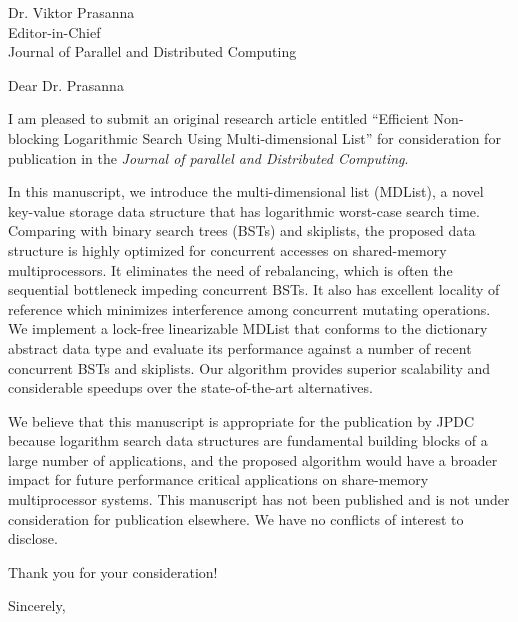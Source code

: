 \documentclass[letterpaper, 10pt]{letter}
\begin{document}
\begin{letter}{Dr. Viktor Prasanna\\Editor-in-Chief\\Journal of Parallel and Distributed Computing}
    \opening{Dear Dr. Prasanna}
    I am pleased to submit an original research article entitled ``Efficient Non-blocking Logarithmic Search Using Multi-dimensional List'' for consideration for publication in the \emph{Journal of parallel and Distributed Computing}.

    In this manuscript, we introduce the multi-dimensional list (MDList), a novel key-value storage data structure that has logarithmic worst-case search time.
    Comparing with binary search trees (BSTs) and skiplists, the proposed data structure is highly optimized for concurrent accesses on shared-memory multiprocessors.
    It eliminates the need of rebalancing, which is often the sequential bottleneck impeding concurrent BSTs. 
    It also has excellent locality of reference which minimizes interference among concurrent mutating operations. 
    We implement a lock-free linearizable MDList that conforms to the dictionary abstract data type and evaluate its performance against a number of recent concurrent BSTs and skiplists.
    Our algorithm provides superior scalability and considerable speedups over the state-of-the-art alternatives.
    
    We believe that this manuscript is appropriate for the publication by JPDC because logarithm search data structures are fundamental building blocks of a large number of applications, and the proposed algorithm would have a broader impact for future performance critical applications on share-memory multiprocessor systems.
    This manuscript has not been published and is not under consideration for publication elsewhere. 
    We have no conflicts of interest to disclose. 

    Thank you for your consideration!
    \closing{Sincerely,}
\end{letter}
\end{document}
